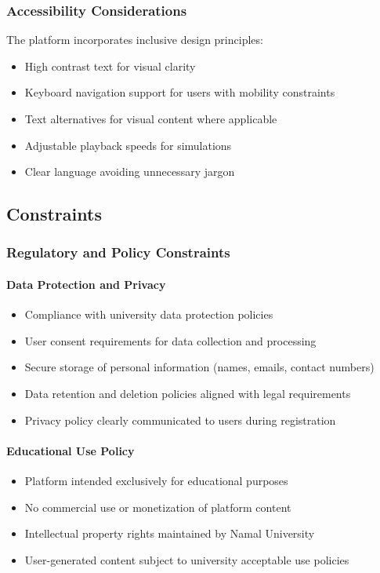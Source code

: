 \documentclass[12pt,a4paper]{article}
\begin{document}
\begin{enumerate}
\subsubsection{Accessibility Considerations}
The platform incorporates inclusive design principles:
\begin{itemize}
    \item High contrast text for visual clarity
    \item Keyboard navigation support for users with mobility constraints
    \item Text alternatives for visual content where applicable
    \item Adjustable playback speeds for simulations
    \item Clear language avoiding unnecessary jargon
\end{itemize}

\subsection{Constraints}

\subsubsection{Regulatory and Policy Constraints}
\paragraph{Data Protection and Privacy}
\begin{itemize}
    \item Compliance with university data protection policies
    \item User consent requirements for data collection and processing
    \item Secure storage of personal information (names, emails, contact numbers)
    \item Data retention and deletion policies aligned with legal requirements
    \item Privacy policy clearly communicated to users during registration
\end{itemize}

\paragraph{Educational Use Policy}
\begin{itemize}
    \item Platform intended exclusively for educational purposes
    \item No commercial use or monetization of platform content
    \item Intellectual property rights maintained by Namal University
    \item User-generated content subject to university acceptable use policies
\end{itemize}


\end{enumerate}
\end{document}
